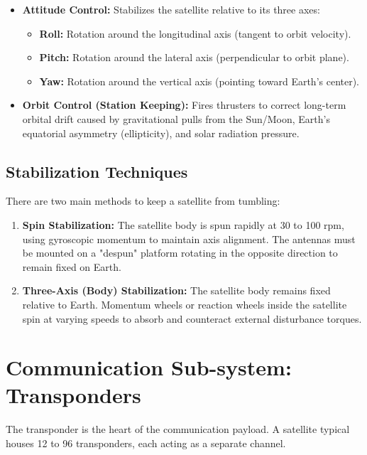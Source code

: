 \documentclass[12pt,a4paper]{article}
\begin{document}
\begin{itemize}[leftmargin=*, itemsep=4pt]
  \item \textbf{Attitude Control:} Stabilizes the satellite relative to its three axes:
    \begin{itemize}[leftmargin=*, itemsep=2pt, topsep=2pt]
      \item \textbf{Roll:} Rotation around the longitudinal axis (tangent to orbit velocity).
      \item \textbf{Pitch:} Rotation around the lateral axis (perpendicular to orbit plane).
      \item \textbf{Yaw:} Rotation around the vertical axis (pointing toward Earth's center).
    \end{itemize}
  \item \textbf{Orbit Control (Station Keeping):} Fires thrusters to correct long-term orbital drift caused by gravitational pulls from the Sun/Moon, Earth's equatorial asymmetry (ellipticity), and solar radiation pressure.
\end{itemize}

\subsection{Stabilization Techniques}
There are two main methods to keep a satellite from tumbling:
\begin{enumerate}[label=\textbf{\arabic*.}, leftmargin=*, itemsep=2pt]
  \item \textbf{Spin Stabilization:} The satellite body is spun rapidly at 30 to 100 rpm, using gyroscopic momentum to maintain axis alignment. The antennas must be mounted on a "despun" platform rotating in the opposite direction to remain fixed on Earth.
  \item \textbf{Three-Axis (Body) Stabilization:} The satellite body remains fixed relative to Earth. Momentum wheels or reaction wheels inside the satellite spin at varying speeds to absorb and counteract external disturbance torques.
\end{enumerate}

\section{Communication Sub-system: Transponders}

The transponder is the heart of the communication payload. A satellite typical houses 12 to 96 transponders, each acting as a separate channel.
\end{document}
